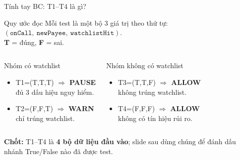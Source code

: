 \documentclass[aspectratio=169,12pt]{beamer}
\begin{document}
\begin{frame}{Tính tay BC: T1--T4 là gì?}
  \begin{block}{Quy ước đọc}
    Mỗi test là một bộ 3 giá trị theo thứ tự:
    $(\texttt{onCall},\ \texttt{newPayee},\ \texttt{watchlistHit})$.\\
    \textbf{T} = đúng, \textbf{F} = sai.
  \end{block}

  \vspace{0.2em}
  \begin{columns}[T]
    \begin{exampleblock}{Nhóm có watchlist}
      \small
      \begin{itemize}
        \item T1=(T,T,T) $\Rightarrow$ \textbf{PAUSE}\\
          đủ 3 dấu hiệu nguy hiểm.
        \item T2=(F,F,T) $\Rightarrow$ \textbf{WARN}\\
          chỉ trúng watchlist.
      \end{itemize}
    \end{exampleblock}

    \begin{exampleblock}{Nhóm không có watchlist}
      \small
      \begin{itemize}
        \item T3=(T,T,F) $\Rightarrow$ \textbf{ALLOW}\\
          không trúng watchlist.
        \item T4=(F,F,F) $\Rightarrow$ \textbf{ALLOW}\\
          không có tín hiệu rủi ro.
      \end{itemize}
    \end{exampleblock}
  \end{columns}

  \vspace{0.15em}
  \small\textbf{Chốt:} T1--T4 là \textbf{4 bộ dữ liệu đầu vào};
  slide sau dùng chúng để đánh dấu nhánh True/False nào đã được test.
\end{frame}
\end{document}
